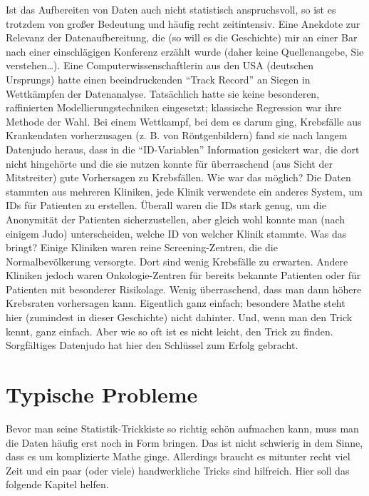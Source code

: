 \documentclass[12pt,ngerman,paper=a4,pagesize,DIV=13]{scrreprt}
\begin{document}
Ist das Aufbereiten von Daten auch nicht statistisch anspruchsvoll, so
ist es trotzdem von großer Bedeutung und häufig recht zeitintensiv. Eine
Anekdote zur Relevanz der Datenaufbereitung, die (so will es die
Geschichte) mir an einer Bar nach einer einschlägigen Konferenz erzählt
wurde (daher keine Quellenangebe, Sie verstehen\ldots{}). Eine
Computerwissenschaftlerin aus den USA (deutschen Ursprungs) hatte einen
beeindruckenden \enquote{Track Record} an Siegen in Wettkämpfen der
Datenanalyse. Tatsächlich hatte sie keine besonderen, raffinierten
Modellierungstechniken eingesetzt; klassische Regression war ihre
Methode der Wahl. Bei einem Wettkampf, bei dem es darum ging, Krebsfälle
aus Krankendaten vorherzusagen (z. B. von Röntgenbildern) fand sie nach
langem Datenjudo heraus, dass in die \enquote{ID-Variablen} Information
gesickert war, die dort nicht hingehörte und die sie nutzen konnte für
überraschend (aus Sicht der Mitstreiter) gute Vorhersagen zu
Krebsfällen. Wie war das möglich? Die Daten stammten aus mehreren
Kliniken, jede Klinik verwendete ein anderes System, um IDs für
Patienten zu erstellen. Überall waren die IDs stark genug, um die
Anonymität der Patienten sicherzustellen, aber gleich wohl konnte man
(nach einigem Judo) unterscheiden, welche ID von welcher Klinik stammte.
Was das bringt? Einige Kliniken waren reine Screening-Zentren, die die
Normalbevölkerung versorgte. Dort sind wenig Krebsfälle zu erwarten.
Andere Kliniken jedoch waren Onkologie-Zentren für bereits bekannte
Patienten oder für Patienten mit besonderer Risikolage. Wenig
überraschend, dass man dann höhere Krebsraten vorhersagen kann.
Eigentlich ganz einfach; besondere Mathe steht hier (zumindest in dieser
Geschichte) nicht dahinter. Und, wenn man den Trick kennt, ganz einfach.
Aber wie so oft ist es nicht leicht, den Trick zu finden. Sorgfältiges
Datenjudo hat hier den Schlüssel zum Erfolg gebracht.

\hypertarget{typische-probleme}{%
\section{Typische Probleme}\label{typische-probleme}}

Bevor man seine Statistik-Trickkiste so richtig schön aufmachen kann,
muss man die Daten häufig erst noch in Form bringen. Das ist nicht
schwierig in dem Sinne, dass es um komplizierte Mathe ginge. Allerdings
braucht es mitunter recht viel Zeit und ein paar (oder viele)
handwerkliche Tricks sind hilfreich. Hier soll das folgende Kapitel
helfen.
\end{document}
